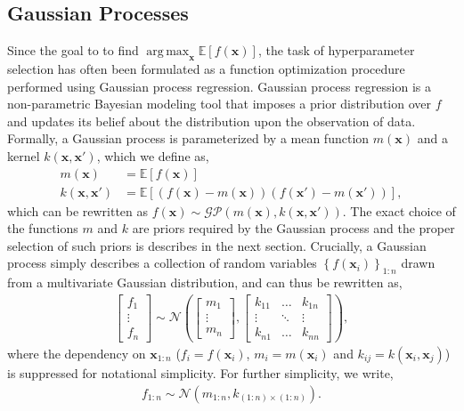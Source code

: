 \documentclass{article}
\DeclareMathOperator*{\argmax}{arg\,max}
\newcommand{\x}{\mathbf{x}}
\newcommand{\N}[1]{\mathcal{N}\left(#1\right)}
\newcommand{\set}[1]{\left\{{#1}\right\}}
\newcommand{\E}[1]{\mathbb{E}\left[#1\right]}
\begin{document}
\subsection{Gaussian Processes}
Since the goal to to find $\argmax_{\x} \E{f(\x)}$, the task of hyperparameter selection has often been formulated as a function optimization procedure performed using Gaussian process regression. Gaussian process regression is a non-parametric Bayesian modeling tool that imposes a prior distribution over $f$ and updates its belief about the distribution upon the observation of data. Formally, a Gaussian process is parameterized by a mean function $m(\x)$ and a kernel $k(\x, \x')$, which we define as,
\begin{align}
  m(\x) &= \E{f(\x)} \\
  k(\x, \x') &= \E{(f(\x) - m(\x))(f(\x') - m(\x'))},
\end{align}
which can be rewritten as $f(\x) \sim \mathcal{GP}(m(\x), k(\x, \x'))$. The exact choice of the functions $m$ and $k$ are priors required by the Gaussian process and the proper selection of such priors is describes in the next section. Crucially, a Gaussian process simply describes a collection of random variables $\set{f(\x_i)}_{1:n}$ drawn from a multivariate Gaussian distribution, and can thus be rewritten as,
\begin{align}
  \begin{bmatrix}
    f_1 \\ \vdots \\ f_n
  \end{bmatrix} \sim
  \N{\begin{bmatrix} m_1 \\ \vdots \\ m_n \end{bmatrix},
    \begin{bmatrix}
      k_{11} & \ldots & k_{1n} \\
      \vdots & \ddots & \vdots \\
      k_{n1} & \ldots & k_{nn}
  \end{bmatrix}},
\end{align}
where the dependency on $\x_{1:n}$ ($f_i = f(\x_i)$, $m_i = m(\x_i)$ and $k_{ij} = k(\x_i, \x_j)$) is suppressed for notational simplicity. For further simplicity, we write,
\begin{align}
  f_{1:n} \sim \N{m_{1:n}, k_{(1:n) \times (1:n)}}.
\end{align}
\end{document}

